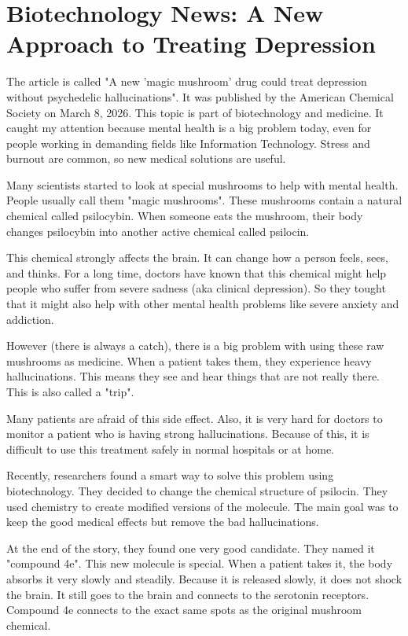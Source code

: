 \chapter{Biotechnology News: A New Approach to Treating Depression}

The article is called "A new 'magic mushroom' drug could treat depression without psychedelic hallucinations". It was published by the American Chemical Society on March 8, 2026. This topic is part of biotechnology and medicine. It caught my attention because mental health is a big problem today, even for people working in demanding fields like Information Technology. 
Stress and burnout are common, so new medical solutions are useful.

Many scientists started to look at special mushrooms to help with mental health. People usually call them "magic mushrooms". 
These mushrooms contain a natural chemical called psilocybin. When someone eats the mushroom, their body changes psilocybin into another active chemical called psilocin. 

This chemical strongly affects the brain. It can change how a person feels, sees, and thinks. For a long time, doctors have known that this chemical might help people who suffer from severe sadness (aka clinical depression). 
So they tought that it might also help with other mental health problems like severe anxiety and addiction.

However (there is always a catch), there is a big problem with using these raw mushrooms as medicine. 
When a patient takes them, they experience heavy hallucinations. This means they see and hear things that are not really there. This is also called a "trip".

Many patients are afraid of this side effect. Also, it is very hard for doctors to monitor a patient who is having strong hallucinations. 
Because of this, it is difficult to use this treatment safely in normal hospitals or at home.

Recently, researchers found a smart way to solve this problem using biotechnology. They decided to change the chemical structure of psilocin. 
They used chemistry to create modified versions of the molecule. The main goal was to keep the good medical effects but remove the bad hallucinations.

At the end of the story, they found one very good candidate. They named it "compound 4e". This new molecule is special. When a patient takes it, the body absorbs it very slowly and steadily. Because it is released slowly, it does not shock the brain. It still goes to the brain and connects to the serotonin receptors. 
Compound 4e connects to the exact same spots as the original mushroom chemical.


